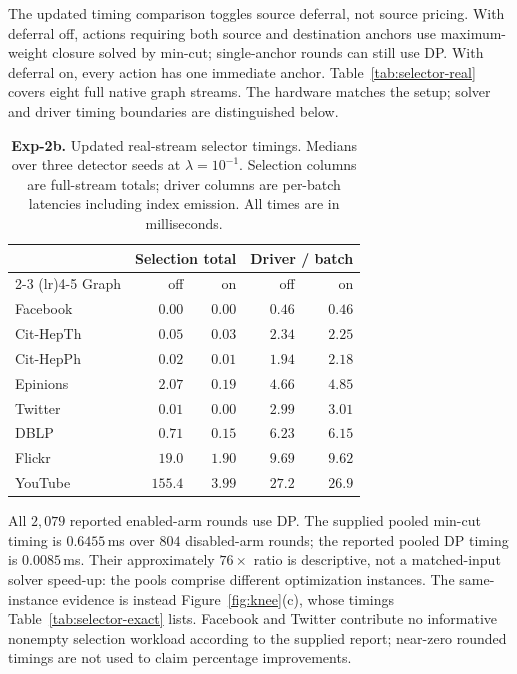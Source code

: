 The updated timing comparison toggles source deferral, not source pricing.
With deferral off, actions requiring both source and destination anchors
use maximum-weight closure solved by min-cut; single-anchor rounds can
still use DP. With deferral on, every action has one immediate anchor.
Table~\ref{tab:selector-real} covers eight full native graph streams.
The hardware matches the setup; solver and driver timing boundaries are
distinguished below.

\begin{table}[tb]\centering
\caption{\textbf{Exp-2b.} Updated real-stream selector timings.
Medians over three detector seeds at $\lambda=10^{-1}$.
Selection columns are full-stream totals; driver columns are per-batch
latencies including index emission. All times are in milliseconds.}
\label{tab:selector-real}
\label{tab:defer-seltime}
\begin{footnotesize}
\setlength{\tabcolsep}{0.3em}
\begin{tabular*}{\linewidth}{@{\extracolsep{\fill}}lrrrr@{}}
\toprule
& \multicolumn{2}{c}{Selection total} & \multicolumn{2}{c}{Driver / batch} \\
\cmidrule(lr){2-3} \cmidrule(lr){4-5}
Graph & off & on & off & on \\
\midrule
Facebook & $0.00$ & $0.00$ & $0.46$ & $0.46$ \\
Cit-HepTh & $0.05$ & $0.03$ & $2.34$ & $2.25$ \\
Cit-HepPh & $0.02$ & $0.01$ & $1.94$ & $2.18$ \\
Epinions & $2.07$ & $0.19$ & $4.66$ & $4.85$ \\
Twitter & $0.01$ & $0.00$ & $2.99$ & $3.01$ \\
DBLP & $0.71$ & $0.15$ & $6.23$ & $6.15$ \\
Flickr & $19.0$ & $1.90$ & $9.69$ & $9.62$ \\
YouTube & $155.4$ & $3.99$ & $27.2$ & $26.9$ \\
\bottomrule
\end{tabular*}
\end{footnotesize}
\end{table}

All $2{,}079$ reported enabled-arm rounds use DP. The supplied pooled
min-cut timing is $0.6455$\,ms over $804$ disabled-arm rounds; the reported
pooled DP timing is $0.0085$\,ms. Their approximately $76\times$ ratio is
descriptive, not a matched-input solver speed-up: the pools comprise
different optimization instances. The same-instance evidence is instead
Figure~\ref{fig:knee}(c), whose timings Table~\ref{tab:selector-exact} lists.
Facebook and Twitter contribute no informative
nonempty selection workload according to the supplied report; near-zero
rounded timings are not used to claim percentage improvements.

